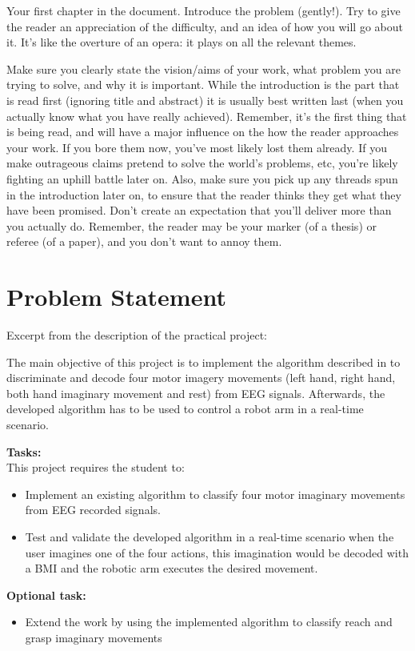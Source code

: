 \documentclass[a4paper,twoside, openright,12pt]{report}
\begin{document}
Your first chapter in the document.
Introduce the problem (gently!). Try to give the reader an appreciation of the difficulty, and an idea of how you will go about it. It's like the overture of an opera: it plays on all the relevant themes.

Make sure you clearly state the vision/aims of your work, what problem you are trying to solve, and why it is important. While the introduction is the part that is read first (ignoring title and abstract) it is usually best written last (when you actually know what you have really achieved). Remember, it's the first thing that is being read, and will have a major influence on the how the reader approaches your work. If you bore them now, you've most likely lost them already. If you make outrageous claims pretend to solve the world's problems, etc, you're likely fighting an uphill battle later on. Also, make sure you pick up any threads spun in the introduction later on, to ensure that the reader thinks they get what they have been promised. Don't create an expectation that you'll deliver more than you actually do. Remember, the reader may be your marker (of a thesis) or referee (of a paper), and you don't want to annoy them.

\section{Problem Statement}
\label{sec:problem}
Excerpt from the description of the practical project: 
\begin{tcolorbox}
The main objective of this project is to implement the algorithm described in \cite{meng2016noninvasive,yong2015eeg} to discriminate and
decode four motor imagery movements (left hand, right hand, both hand imaginary movement and
rest) from EEG signals. Afterwards, the developed algorithm has to be used to control a robot arm in a
real-time scenario.

\textbf{Tasks:}\\
This project requires the student to:
\begin{itemize}
	\item Implement an existing algorithm to classify four motor imaginary movements from EEG
	recorded signals.
	\item Test and validate the developed algorithm in a real-time scenario when the user imagines one
	of the four actions, this imagination would be decoded with a BMI and the robotic arm
	executes the desired movement.
\end{itemize}


\textbf{Optional task:}
\begin{itemize}
	\item Extend the work by using the implemented algorithm to classify reach and grasp imaginary
	movements
\end{itemize}
\end{tcolorbox}
\end{document}
